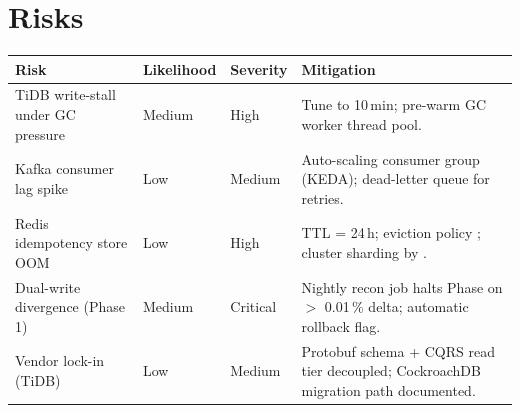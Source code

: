 \section{Risks}

\begin{tabularx}{\linewidth}{@{}K@{\hspace{6mm}}l@{\hspace{4mm}}l@{\hspace{4mm}}V@{}}
\toprule
Risk & Likelihood & Severity & Mitigation \\
\midrule
TiDB write-stall under GC pressure & Medium & High & Tune  to 10\,min; pre-warm GC worker thread pool. \\
Kafka consumer lag spike & Low & Medium & Auto-scaling consumer group (KEDA); dead-letter queue for retries. \\
Redis idempotency store OOM & Low & High & TTL = 24\,h; eviction policy ; cluster sharding by . \\
Dual-write divergence (Phase 1) & Medium & Critical & Nightly recon job halts Phase on $>$ 0.01\,\% delta; automatic rollback flag. \\
Vendor lock-in (TiDB) & Low & Medium & Protobuf schema + CQRS read tier decoupled; CockroachDB migration path documented. \\
\bottomrule
\end{tabularx}

